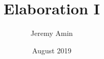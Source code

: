 \documentclass{article}
\title{Elaboration I}
\author{Jeremy Amin}
\date{August 2019}
\begin{document}
\maketitle

\section{}
\end{document}
